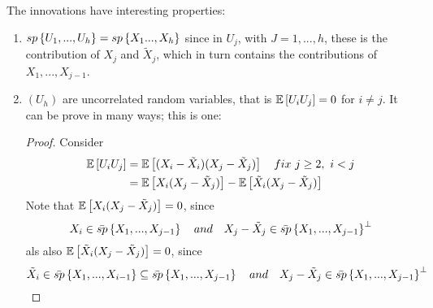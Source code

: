 The innovations have interesting properties:
\begin{enumerate}
    \item $sp\left\{U_1,...,U_h\right\}=sp\left\{X_1...,X_h\right\}$ since in $U_j$, with $J=1,...,h$, these is the contribution of $X_j$ and $\tilde{X}_j$, which in turn contains the contributions of $X_1,...,X_{j-1}$.
    \item $(U_h)$ are uncorrelated random variables, that is $\mathbb{E}\left[U_iU_j\right]=0$ for $i\ne j$. It can be prove in many ways; this is one:
        \begin{proof}
            Consider
            \begin{equation*}
                \begin{split}
                    \expect{U_iU_j}&=\expect{(X_i-\tilde{X}_i)(X_j-\tilde{X}_j)}\ \ \ fix\ j\ge2,\ i<j\\
                    &=\expect{X_i(X_j-\tilde{X}_j)}-\expect{\tilde{X}_i(X_j-\tilde{X}_j)}
                \end{split}
            \end{equation*}
            Note that $\mathbb{E}\left[X_i(X_j-\tilde{X}_j)\right]=0$, since
            \[
                X_i\in\mean{sp}\set{X_1,...,X_{j-1}}\ \ \ and\ \ \ X_j-\tilde{X}_j\in\mean{sp}\set{X_1,...,X_{j-1}}^\perp 
            \]
            als also $\mathbb{E}\left[\tilde{X}_i(X_j-\tilde{X}_j)\right]=0$, since
            \[
                \tilde{X}_i\in\mean{sp}\set{X_1,...,X_{i-1}}\subseteq\mean{sp}\set{X_1,...,X_{j-1}}\ \ \ and\ \ \ X_j-\tilde{X}_j\in\mean{sp}\set{X_1,...,X_{j-1}}^\perp 
            \]
        \end{proof}  
\end{enumerate}

